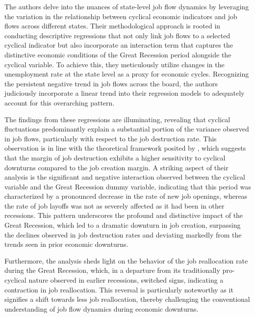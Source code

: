 \documentclass[12pt]{article}
\begin{document}
The authors delve into the nuances of state-level job flow dynamics by leveraging the variation in the relationship
between cyclical economic indicators and job flows across different states. Their methodological approach is rooted in
conducting descriptive regressions that not only link job flows to a selected cyclical indicator but also incorporate an
interaction term that captures the distinctive economic conditions of the Great Recession period alongside the cyclical
variable. To achieve this, they meticulously utilize changes in the unemployment rate at the state level as a proxy for
economic cycles. Recognizing the persistent negative trend in job flows across the board, the authors judiciously
incorporate a linear trend into their regression models to adequately account for this overarching pattern. 

The findings from these regressions are illuminating, revealing that cyclical fluctuations predominantly explain a
substantial portion of the variance observed in job flows, particularly with respect to the job destruction rate. This
observation is in line with the theoretical framework posited by \cite{CabHarm94}, which suggests that the
margin of job destruction exhibits a higher sensitivity to cyclical downturns compared to the job creation margin. A
striking aspect of their analysis is the significant and negative interaction observed between the cyclical variable and
the Great Recession dummy variable, indicating that this period was characterized by a pronounced decrease in the rate
of new job openings, whereas the rate of job layoffs was not as severely affected as it had been in other recessions.
This pattern underscores the profound and distinctive impact of the Great Recession, which led to a dramatic downturn in
job creation, surpassing the declines observed in job destruction rates and deviating markedly from the trends seen in
prior economic downturns. 

Furthermore, the analysis sheds light on the behavior of the job reallocation rate during the Great Recession, which, in
a departure from its traditionally pro-cyclical nature observed in earlier recessions, switched signs, indicating a
contraction in job reallocation. This reversal is particularly noteworthy as it signifies a shift towards less job
reallocation, thereby challenging the conventional understanding of job flow dynamics during economic downturns. 
\end{document}
